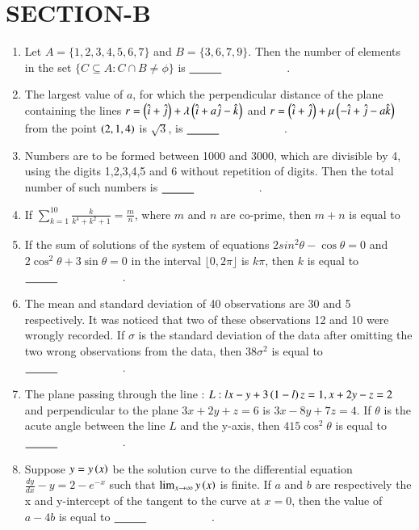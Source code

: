 \documentclass[journal,12pt,onecolumn]{IEEEtran}
\theoremstyle{remark}
\begin{document}
    \section{SECTION-B}
    \begin{enumerate}
        \item Let $A=\{1,2,3,4,5,6,7\}$ and $B=\{3,6,7,9\}$. Then the number of elements in the set $\{C\subseteq A: C \cap B \neq \phi\}$ is $\makebox[3cm][l]{\underline{\hspace{1cm}}}$.
        \item The largest value of $a$, for which the perpendicular distance of the plane containing the lines $r=\left(\hat{i}+\hat{j}\right)+\lambda\left(\hat{i}+a\hat{j}-\hat{k}\right)$ and $r=\left(\hat{i}+\hat{j}\right)+\mu\left(-\hat{i}+\hat{j}-a\hat{k}\right)$ from the point $\left(2,1,4\right)$ is $\sqrt{3}$, is $\makebox[3cm][l]{\underline{\hspace{1cm}}}$.  
        \item Numbers are to be formed between 1000 and 3000, which are divisible by 4, using the digits 1,2,3,4,5 and 6 without repetition of digits. Then the total number of such numbers is $\makebox[3cm][l]{\underline{\hspace{1cm}}}$.
        \item If $\sum_{k=1}^{10}\frac{k}{k^4+k^2+1}=\frac{m}{n}$, where $m$ and $n$ are co-prime, then $m+n$ is equal to
        \item If the sum of solutions of the system of equations $2sin^{2}\theta-\cos\theta=0$ and $2\cos^{2}\theta+3\sin \theta=0$ in the interval $\lfloor 0,2\pi \rfloor$ is $k\pi$, then $k$ is equal to $\makebox[3cm][l]{\underline{\hspace{1cm}}}$.
        \item The mean and standard deviation of 40 observations are 30 and 5 respectively. It was noticed that two of these observations 12 and 10 were wrongly recorded. If $\sigma$ is the standard deviation of the data after omitting the two wrong observations from the data, then $38\sigma^{2}$ is equal to $\makebox[3cm][l]{\underline{\hspace{1cm}}}$.
        \item The plane passing through the line : $L:lx-y+3\left(1-l\right)z=1,x+2y-z=2$ and perpendicular to the plane $3x+2y+z=6$ is $3x-8y+7z=4$. If $\theta$ is the acute angle between the line $L$ and the y-axis, then $415\cos^{2}\theta$ is equal to $\makebox[3cm][l]{\underline{\hspace{1cm}}}$.
        \item Suppose $y=y\left(x\right)$ be the solution curve to the differential equation $\frac{dy}{dx}-y=2-e^{-x}$ such that $\lim_{x \to \infty} y\left(x\right)$ is finite. If $a$ and $b$ are respectively the x and y-intercept of the tangent to the curve at $x=0$, then the value of $a-4b$ is equal to $\makebox[3cm][l]{\underline{\hspace{1cm}}}$.

\end{enumerate}
\end{document}
